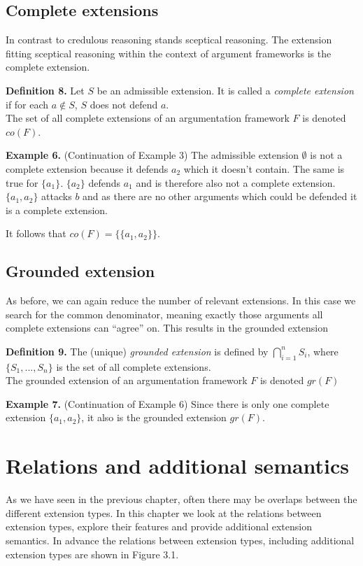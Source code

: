 \documentclass[draft,final]{vutinfth} %
\newcommand{\hl}{\par\vspace{6pt}} %
\newcommand{\cl}{\par\vspace{12pt}} %
\begin{document}
\section{Complete extensions}

In contrast to credulous reasoning stands sceptical reasoning. The extension fitting sceptical reasoning within the context of argument frameworks is the complete extension.\cl

\textbf{Definition 8.} Let $S$ be an admissible extension. It is called a \emph{complete extension} if for each $a\not\in S$, $S$ does not defend $a$.\\
The set of all complete extensions of an argumentation framework $F$ is denoted $co(F)$.\cl

\textbf{Example 6.} (Continuation of Example 3) The admissible extension $\emptyset$ is not a complete extension because it defends $a_2$ which it doesn't contain. The same is true for $\{a_1\}$. $\{a_2\}$ defends $a_1$ and is therefore also not a complete extension.\\
$\{a_1,a_2\}$ attacks $b$ and as there are no other arguments which could be defended it is a complete extension.\hl
It follows that $co(F)=\{\{a_1,a_2\}\}$.\cl

\section{Grounded extension}

As before, we can again reduce the number of relevant extensions. In this case we search for the common denominator, meaning exactly those arguments all complete extensions can ``agree'' on. This results in the grounded extension\cl

\textbf{Definition 9.} The (unique) \emph{grounded extension} is defined by $\bigcap\limits_{i=1}^n{S_i}$, where $\{S_1,...,S_n\}$ is the set of all complete extensions.\\
The grounded extension of an argumentation framework $F$ is denoted $gr(F)$\cl

\textbf{Example 7.} (Continuation of Example 6) Since there is only one complete extension $\{a_1,a_2\}$, it also is the grounded extension $gr(F)$.\cl

\chapter{Relations and additional semantics} %

As we have seen in the previous chapter, often there may be overlaps between the different extension types. In this chapter we look at the relations between extension types, explore their features and provide additional extension semantics. In advance the relations between extension types, including additional extension types are shown in Figure 3.1.\cl %
\end{document}
